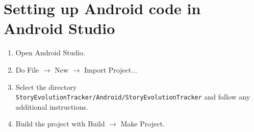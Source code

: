 \documentclass[11pt]{article}
\begin{document}
\section{Setting up Android code in Android Studio}
\begin{enumerate}
	\item Open Android Studio.
	\item Do File $\rightarrow$ New $\rightarrow$ Import Project...
	\item Select the directory \lstinline|StoryEvolutionTracker/Android/StoryEvolutionTracker| and follow any additional instructions.
	\item Build the project with Build $\rightarrow$ Make Project.
\end{enumerate}
\end{document}
